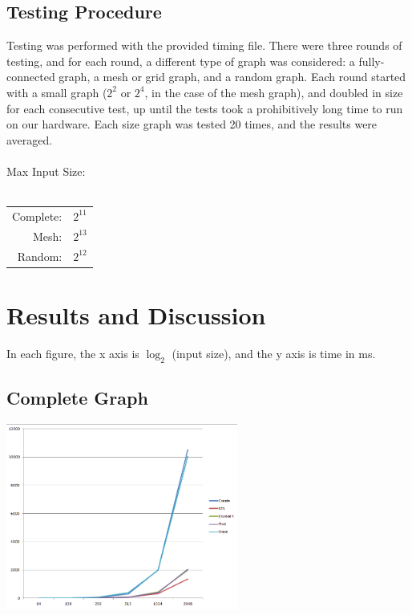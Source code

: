 \documentclass[titlepage]{article}
\newenvironment{Figure}
  {\par\medskip\noindent\minipage{\linewidth}}
  {\endminipage\par\medskip}
\begin{document}
\begin{multicols*}{2}
            \subsection{Testing Procedure}
                Testing was performed with the provided timing file. There were three rounds of testing, and for each round, a different type of graph was considered: a fully-connected graph, a mesh or grid graph, and a random graph. Each round started with a small graph ($2^2$ or $2^4$, in the case of the mesh graph), and doubled in size for each consecutive test, up until the tests took a prohibitively long time to run on our hardware. Each size graph was tested 20 times, and the results were averaged. \\ \\
                Max Input Size: \\ \\
                \begin{tabular}{r l}
                Complete:   & $2^{11}$ \\
                Mesh:       & $2^{13}$ \\
                Random:     & $2^{12}$ \\
                \end{tabular}
        \section{Results and Discussion}
            In each figure, the x axis is $\log_2$ (input size), and the y axis is time in ms.
            \subsection{Complete Graph}
                \begin{Figure}
                    \centering
                    \includegraphics[width=3in]{complete}
                \end{Figure}




\end{multicols*}
\end{document}
